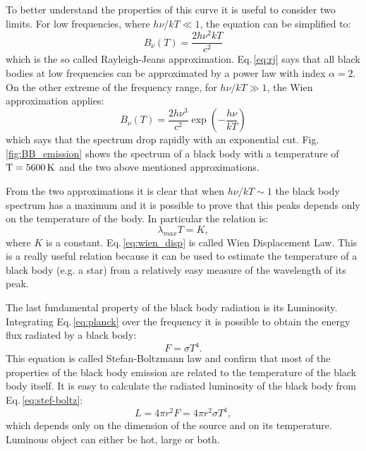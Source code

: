 \documentclass[../main.tex]{subfiles}
\begin{document}
To better understand the properties of this curve it is useful to consider two limits.
For low frequencies, where $h\nu/kT \ll 1$, the equation can be simplified to:
\begin{equation}
    \label{eq:rj}
    B_{\nu}(T) = \frac{2h\nu^2kT}{c^2}
\end{equation}
which is the so called Rayleigh-Jeans approximation.
Eq.\,\ref{eq:rj} says that all black bodies at low frequencies can be approximated by a power law with index $\alpha = 2$.
On the other extreme of the frequency range, for $h\nu/kT \gg 1$, the Wien approximation applies:
\begin{equation}
    \label{eq:wien}
    B_{\nu}(T) = \frac{2h\nu^3}{c^2}\exp\left(-\frac{h\nu}{kT}\right)
\end{equation}
which says that the spectrum drop rapidly with an exponential cut.
Fig.\,\ref{fig:BB_emission} shows the spectrum of a black body with a temperature of $\rm T=5600\,\si{K}$ and the two above mentioned approximations.

From the two approximations it is clear that when $h\nu/kT \sim 1$ the black body spectrum has a maximum and it is possible to prove that this peaks depends only on the temperature of the body.
In particular the relation is:
\begin{equation}
    \label{eq:wien_disp}
    \lambda_{max}T=K,
\end{equation}
where $K$ is a constant.
Eq.\,\ref{eq:wien_disp} is called Wien Displacement Law.
This is a really useful relation because it can be used to estimate the temperature of a black body (e.g. a star) from a relatively easy measure of the wavelength of its peak.

The last fundamental property of the black body radiation is its Luminosity.
Integrating Eq.\,\ref{eq:planck} over the frequency it is possible to obtain the energy flux radiated by a black body:
\begin{equation}
    \label{eq:stef-boltz}
    F = \sigma T^4.
\end{equation}
This equation is called Stefan-Boltzmann law and confirm that most of the properties of the black body emission are related to the temperature of the black body itself.
It is easy to calculate the radiated luminosity of the black body from Eq.\,\ref{eq:stef-boltz}:
\begin{equation}
    \label{eq:luminosity}
    L = 4\pi r^2 F = 4\pi r^2\sigma T^4,
\end{equation}
which depends only on the dimension of the source and on its temperature.
Luminous object can either be hot, large or both.
\end{document}
